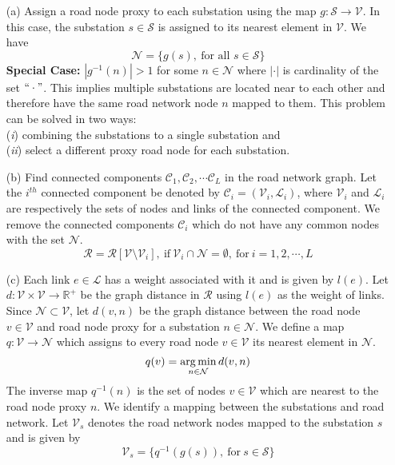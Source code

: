 \begin{enumerate}
	\item[(a)] Assign a road node proxy to each substation using the map $g:\mathcal{S}\rightarrow \mathcal{V}$. In this case, the substation $s\in\mathcal{S}$ is assigned to its nearest element in $\mathcal{V}$. We have
	\begin{equation}\mathcal{N}=\{g(s),\ \textrm{for all }s\in\mathcal{S}\}\end{equation} 
	\textbf{Special Case:} $|g^{-1}(n)|>1$ for some $n\in\mathcal{N}$ where $|\cdot|$ is cardinality of the set $``\cdot"$. This implies multiple substations are located near to each other and therefore have the same road network node $n$ mapped to them. This problem can be solved in two ways:\\
	(\textit{i}) combining the substations to a single substation and\\
	(\textit{ii}) select a different proxy road node for each substation.
	\item[(b)] Find connected components $\mathcal{C}_1,\mathcal{C}_2,\cdots\mathcal{C}_L$ in the road network graph. Let the $i^{th}$ connected component be denoted by $\mathcal{C}_i=(\mathcal{V}_i,\mathcal{L}_i)$, where $\mathcal{V}_i$ and $\mathcal{L}_i$ are respectively the sets of nodes and links of the connected component. We remove the connected components $\mathcal{C}_i$ which do not have any common nodes with the set $\mathcal{N}$. 
	\begin{equation}\mathcal{R}=\mathcal{R}[\mathcal{V}\setminus\mathcal{V}_i],\ \textrm{if}\ \mathcal{V}_i\cap\mathcal{N}=\emptyset,\ \textrm{for}\ i=1,2,\cdots,L\end{equation}
	\item[(c)] Each link $e\in\mathcal{L}$ has a weight associated with it and is given by $l(e)$. Let $d:\mathcal{V}\times\mathcal{V}\rightarrow\mathbb{R}^{+}$ be the graph distance in $\mathcal{R}$ using $l(e)$ as the weight of links. Since $\mathcal{N}\subset\mathcal{V}$, let $d(v,n)$ be the graph distance between the road node $v\in\mathcal{V}$ and road node proxy for a substation $n\in\mathcal{N}$. We define a map $q:\mathcal{V}\rightarrow\mathcal{N}$ which assigns to every road node $v\in\mathcal{V}$ its nearest element in $\mathcal{N}$.
	\begin{equation}q(v)=\operatorname*{arg\,min}_{n\in\mathcal{N}}{d(v,n)}\end{equation}
	The inverse map $q^{-1}(n)$ is the set of nodes $v\in\mathcal{V}$ which are nearest to the road node proxy $n$.	We identify a mapping between the substations and road network. Let $\mathcal{V}_s$ denotes the road network nodes mapped to the substation $s$ and is given by
	\begin{equation}\mathcal{V}_s=\{q^{-1}(g(s)),\ \textrm{for}\ s\in\mathcal{S}\}\end{equation}
	

\end{enumerate}
